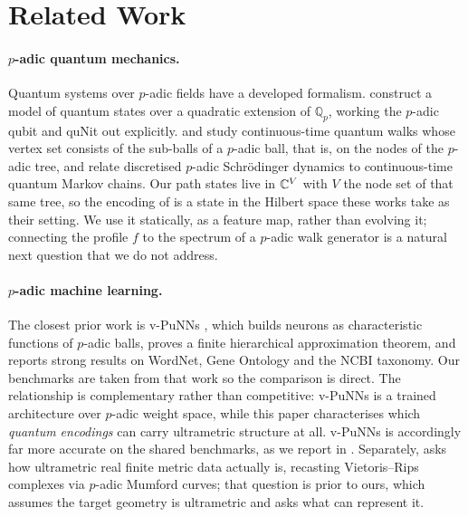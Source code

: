 \section{Related Work}
\label{sec:related-work}

\paragraph{$p$-adic quantum mechanics.}
Quantum systems over $p$-adic fields have a developed formalism.
\citet{AnielloEtAl2023PadicQubit} construct a model of quantum states over a quadratic
extension of $\mathbb{Q}_p$, working the $p$-adic qubit and quNit out explicitly.
\citet{ZunigaGalindo2024QuantumWalks} and \citet{ZunigaGalindo2025TwoAdic} study
continuous-time quantum walks whose vertex set consists of the sub-balls of a $p$-adic
ball, that is, on the nodes of the $p$-adic tree, and
\citet{ZunigaGalindoChaconCortes2025QuantumMarkov} relate discretised $p$-adic
Schrödinger dynamics to continuous-time quantum Markov chains. Our path states live in
$\mathbb{C}^{V}$ with $V$ the node set of that same tree, so the encoding of
 is a state in the Hilbert space these works take as their
setting. We use it statically, as a feature map, rather than evolving it; connecting
the profile $f$ to the spectrum of a $p$-adic walk generator is a natural next question
that we do not address.

\paragraph{$p$-adic machine learning.}
The closest prior work is v-PuNNs \citep{Nguessan2025VPuNNs}, which builds neurons as
characteristic functions of $p$-adic balls, proves a finite hierarchical approximation
theorem, and reports strong results on WordNet, Gene Ontology and the NCBI taxonomy.
Our benchmarks are taken from that work so the comparison is direct. The relationship
is complementary rather than competitive: v-PuNNs is a trained architecture over
$p$-adic weight space, while this paper characterises which \emph{quantum encodings}
can carry ultrametric structure at all. v-PuNNs is accordingly far more accurate on
the shared benchmarks, as we report in . Separately, \citet{Bradley2025LocalUltrametricity} asks how
ultrametric real finite metric data actually is, recasting Vietoris--Rips complexes via
$p$-adic Mumford curves; that question is prior to ours, which assumes the target
geometry is ultrametric and asks what can represent it.

